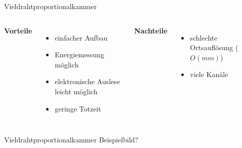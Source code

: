 \begin{frame}{Vieldrahtproportionalkammer}
    \begin{columns}[T]
			\textbf{Vorteile}	
			\vspace{0.7cm}	
			\begin{itemize}
				\item einfacher Aufbau
			  	\item Energiemessung möglich
			  	\item elektronische Auslese leicht möglich
			  	\item geringe Totzeit 
			\end{itemize}	
	    	\textbf{Nachteile}
	    	\vspace{0.7cm}
	    	\begin{itemize}
			  \item schlechte Ortsauflösung ($O(mm)$)
			  \item viele Kanäle
			\end{itemize}
    \end{columns}
    \vspace{1cm}
\end{frame}

\begin{frame}{Vieldrahtproportionalkammer}
    Beispielbild?
\end{frame}
